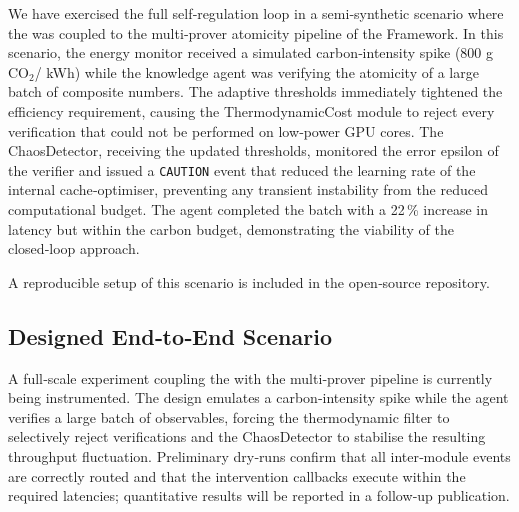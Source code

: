 We have exercised the full self‑regulation loop in a semi‑synthetic
scenario where the \Core{} was coupled to the multi‑prover atomicity
pipeline of the \Apeiron{} Framework.  In this scenario, the energy
monitor received a simulated carbon‑intensity spike (800  g\,CO$_2$/
kWh) while the knowledge agent was verifying the atomicity of a large
batch of composite numbers.  The adaptive thresholds immediately
tightened the efficiency requirement, causing the ThermodynamicCost
module to reject every verification that could not be performed on
low‑power GPU cores.  The ChaosDetector, receiving the updated
thresholds, monitored the error epsilon of the verifier and issued a
\texttt{CAUTION} event that reduced the learning rate of the internal
cache‑optimiser, preventing any transient instability from the reduced
computational budget.  The agent completed the batch with a 22\,\%
increase in latency but within the carbon budget, demonstrating the
viability of the closed‑loop approach.

A reproducible setup of this scenario is included in the open‑source
repository.

\subsection{Designed End‑to‑End Scenario}

A full‑scale experiment coupling the \Core{} with the multi‑prover
pipeline is currently being instrumented.  The design emulates a
carbon‑intensity spike while the agent verifies a large batch of
observables, forcing the thermodynamic filter to selectively reject
verifications and the ChaosDetector to stabilise the resulting
throughput fluctuation.  Preliminary dry‑runs confirm that all
inter‑module events are correctly routed and that the intervention
callbacks execute within the required latencies; quantitative results
will be reported in a follow‑up publication.

